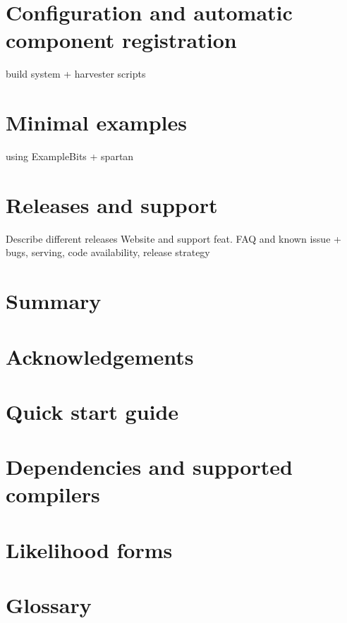 \documentclass[11pt,a4paper]{article}
\begin{document}
\section{Configuration and automatic component registration}
build system + harvester scripts

\section{Minimal examples}
using ExampleBits + spartan

\section{Releases and support}
Describe different releases 
Website and support feat. FAQ and known issue + bugs, serving, code availability, release strategy

\section{Summary}

\section{Acknowledgements}

\appendix
\section{Quick start guide}
\section{Dependencies and supported compilers}
\section{Likelihood forms}
\section{Glossary}
\end{document}
